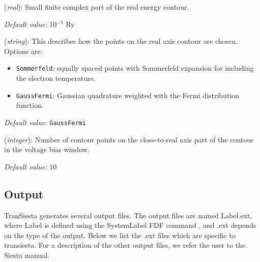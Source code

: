 \documentclass[11pt]{article}
\begin{document}
\begin{description}
    \itemsep 10pt
    \parsep 0pt
    
    \item[{\bf TS.BiasContour.Eta}] ({\it real}): 
        Small finite complex part of the real energy contour.

        {\it Default value:} 10$^{-5}$ Ry  
        
    \item[{\bf TS.BiasContour.Method}] ({\it string}): 
        This describes how the points on the real axis contour are chosen. 
        Options are: \begin{itemize} 
                       \item {\tt Sommerfeld}: equally spaced points with Sommerfeld 
                       expansion for including the electron temperature. 
                       \item {\tt GaussFermi}: Gaussian quadrature weighted with 
                       the Fermi distribution function.
                    \end{itemize}
                    
        {\it Default value:} {\tt GaussFermi}
        
    \item[{\bf TS.BiasContour.NumPoints}] ({\it integer}): 
        Number of contour points on the close-to-real axis part of the contour in the voltage bias window.

        {\it Default value:} 10
        
\end{description}    

\subsection{Output}

{\sc TranSiesta} generates several output files. 
The output files are named Label.ext, where Label is defined using the 
SystemLabel FDF command , and .ext depends on the type of the output. 
Below we list the .ext files which are specific to transiesta. 
For a description of the other output files, we refer the user to 
the  {\sc Siesta} manual.
\end{document}
